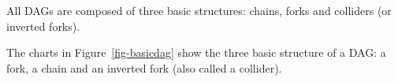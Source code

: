 \documentclass[
  super,
  preprint,
  3p]{elsarticle}
\begin{document}
All DAGs are composed of three basic structures: chains, forks and
colliders (or inverted forks).

The charts in Figure~\ref{fig-basicdag} show the three basic structure
of a DAG: a fork, a chain and an inverted fork (also called a collider).

\begin{figure}

\begin{minipage}[t]{0.33\linewidth}

{\centering 


}

\end{minipage}%
%
\begin{minipage}[t]{0.33\linewidth}

{\centering 

}
\end{minipage}
\end{figure}
\end{document}
